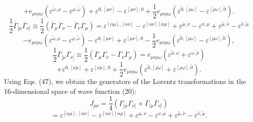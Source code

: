 \documentclass[a4paper,12pt]{article}
\begin{document}
\vspace{-8mm}
\begin{equation}  \label{97}
\end{equation}
\vspace{-8mm}
\[
+e_{\mu \nu \rho \omega }\left(\varepsilon ^{\widetilde{\omega
},\rho} - \varepsilon ^{\rho,\widetilde{\omega }}\right) +
\varepsilon ^{0,[\mu\nu]}-\varepsilon ^{[\mu\nu],0} +
\frac{1}{2}e_{\mu\nu\rho\omega}\left(\varepsilon^{\widetilde{0},
[\rho\omega]} -\varepsilon^{[\rho\omega],\widetilde{0}}\right) .
\]
\[
\frac{1}{2}\overline{\Gamma }_{[\mu} \overline{\Gamma }_{\nu
]}\equiv\frac{1}{2}\left(\overline{\Gamma }_\mu \overline{\Gamma
}_\nu -\overline{\Gamma }_\nu \overline{\Gamma
}_\mu\right)=\varepsilon ^{[\alpha\mu],[\alpha\nu]}- \varepsilon
^{[\alpha\nu][ \alpha\mu]} +\varepsilon ^{\mu,\nu}-\varepsilon
^{\nu,\mu} + \varepsilon^{\widetilde{\mu},\widetilde{\nu}} -
\varepsilon^{\widetilde{\nu},\widetilde{\mu}}
\]
\vspace{-8mm}
\begin{equation}  \label{98}
\end{equation}
\vspace{-8mm}
\[
-e_{\mu \nu \rho \omega }\left(\varepsilon ^{\widetilde{\omega
},\rho} - \varepsilon ^{\rho,\widetilde{\omega }}\right) -
\varepsilon ^{0,[\mu\nu]}+\varepsilon ^{[\mu\nu],0} -
\frac{1}{2}e_{\mu\nu\rho\omega}\left(\varepsilon^{\widetilde{0},
[\rho\omega]} -\varepsilon^{[\rho\omega],\widetilde{0}}\right) ,
\]
\[
\frac{1}{2}\overline{\Gamma }_{[\mu} \Gamma _{\nu
]}\equiv\frac{1}{2}\left(\overline{\Gamma }_\mu \Gamma _\nu
-\overline{\Gamma} _\nu \Gamma _\mu\right)= e_{\mu \nu \rho \omega
}\left(\varepsilon ^{\widetilde{\rho},\omega } + \varepsilon
^{\omega,\widetilde{\rho}}\right)
\]
\vspace{-8mm}
\begin{equation}  \label{99}
\end{equation}
\vspace{-8mm}
\[
 + \varepsilon ^{0,[\nu \mu]}+\varepsilon ^{[\nu \mu],0} +
\frac{1}{2}e_{\mu\nu\rho\omega}\left(\varepsilon^{\widetilde{0},
[\rho\omega]} +\varepsilon^{[\rho\omega],\widetilde{0}}\right) .
\]
Using Eqs. (47), we obtain the generators of the Lorentz
transformations in the 16-dimensional space of wave function (20):
\[
J_{\mu \nu }=\frac 14\left( \Gamma _{[\mu} \Gamma _{\nu ]}
+\overline{\Gamma }_{[\mu} \overline{\Gamma }_{\nu ]}\right)
\]
\vspace{-8mm}
\begin{equation}  \label{100}
\end{equation}
\vspace{-8mm}
\[
=\varepsilon ^{[\alpha\mu],[\alpha\nu]}- \varepsilon
^{[\alpha\nu][ \alpha\mu]} +\varepsilon ^{\mu,\nu}-\varepsilon
^{\nu,\mu} + \varepsilon^{\widetilde{\mu},\widetilde{\nu}} -
\varepsilon^{\widetilde{\nu},\widetilde{\mu}} .
\]
\end{document}
